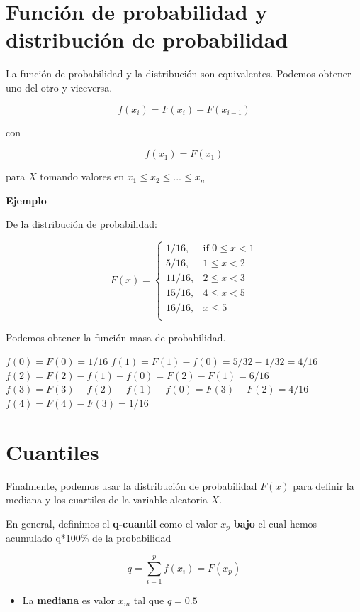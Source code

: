 \documentclass[
]{book}
\providecommand{\tightlist}{%
  \setlength{\itemsep}{0pt}\setlength{\parskip}{0pt}}
\begin{document}
\hypertarget{funciuxf3n-de-probabilidad-y-distribuciuxf3n-de-probabilidad}{%
\section{Función de probabilidad y distribución de probabilidad}\label{funciuxf3n-de-probabilidad-y-distribuciuxf3n-de-probabilidad}}

La función de probabilidad y la distribución son equivalentes. Podemos obtener uno del otro y viceversa.

\[f(x_i)=F(x_i)-F(x_{i-1})\]

con

\[f(x_1)=F(x_1)\]

para \(X\) tomando valores en \(x_1 \leq x_2 \leq ... \leq x_n\)

\textbf{Ejemplo}

De la distribución de probabilidad:

\[
    F(x)=
\begin{cases}
    1/16,& \text{if } 0 \leq x < 1\\
    5/16,& 1\leq x < 2\\
    11/16,& 2\leq x < 3\\
    15/16,& 4\leq x < 5\\
    16/16,&  x \leq 5\\
\end{cases}
\]

Podemos obtener la función masa de probabilidad.

\(f(0)=F(0)=1/16\)
\(f(1)=F(1)-f(0)=5/32-1/32=4/16\)
\(f(2)=F(2)-f(1)-f(0)=F(2)-F(1)=6/16\)
\(f(3)=F(3)-f(2)-f(1)-f(0)=F(3)-F(2)=4/16\)
\(f(4)=F(4)-F(3)=1/16\)

\hypertarget{cuantiles}{%
\section{Cuantiles}\label{cuantiles}}

Finalmente, podemos usar la distribución de probabilidad \(F(x)\) para definir la mediana y los cuartiles de la variable aleatoria \(X\).

En general, definimos el \textbf{q-cuantil} como el valor \(x_{p}\) \textbf{bajo} el cual hemos acumulado q*100\% de la probabilidad

\[q=\sum_{i=1}^pf(x_i) = F (x_p)\]

\begin{itemize}
\tightlist
\item
  La \textbf{mediana} es valor \(x_m\) tal que \(q=0.5\)
\end{itemize}
\end{document}
